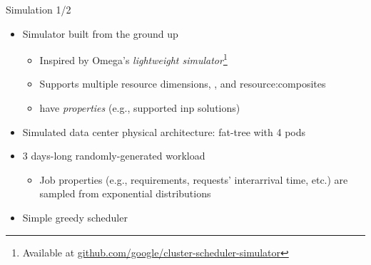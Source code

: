\begin{frame}{Simulation 1/2}
    \begin{itemize}
        \item Simulator built from the ground up %
        \begin{itemize}
            \item Inspired by Omega's \cite{omega} \textit{lightweight simulator}\footnote[2]{\scriptsize{Available at \href{https://github.com/google/cluster-scheduler-simulator}{github.com/google/cluster-scheduler-simulator}}}
            \item Supports multiple resource dimensions, , and \glspl{resource:composite}
            \item {} have \textit{properties} (e.g., supported \gls*{inp} solutions) %
        \end{itemize}
        \item Simulated data center physical architecture: fat-tree with 4 pods
        \item 3 days-long randomly-generated workload
        \begin{itemize}
            \item Job properties (e.g., requirements, requests' interarrival time, etc.) are sampled from exponential distributions %
        \end{itemize}
        \item Simple greedy scheduler
    \end{itemize}
\end{frame}

